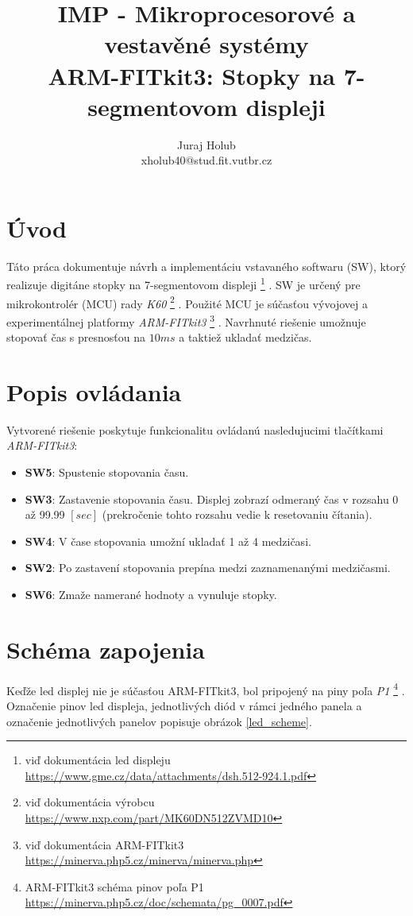 \documentclass[a4paper, 10pt]{article}
\title{IMP - Mikroprocesorové a vestavěné systémy \\ \medskip\medskip \large{ARM-FITkit3: Stopky na 7-segmentovom displeji}}
\author{Juraj Holub \\xholub40@stud.fit.vutbr.cz}
\begin{document}
	\maketitle
	\thispagestyle{empty}

\section{Úvod}
Táto práca dokumentuje návrh a implementáciu vstavaného softwaru (SW), ktorý realizuje digitáne stopky na 7-segmentovom displeji \footnote{viď dokumentácia led displeju  \href{https://www.gme.cz/data/attachments/dsh.512-924.1.pdf}{https://www.gme.cz/data/attachments/dsh.512-924.1.pdf}} . SW je určený pre mikrokontrolér (MCU) rady \textit{K60} \footnote{viď dokumentácia výrobcu  \href{https://www.nxp.com/part/MK60DN512ZVMD10}{https://www.nxp.com/part/MK60DN512ZVMD10}} . Použité MCU je súčasťou vývojovej a experimentálnej platformy \textit{ARM-FITkit3} \footnote{viď dokumentácia ARM-FITkit3  \href{https://minerva.php5.cz/minerva/minerva.php}{https://minerva.php5.cz/minerva/minerva.php}} . Navrhnuté riešenie umožnuje stopovať čas s presnosťou na $10ms$ a taktiež ukladať medzičas.

\section{Popis ovládania}
Vytvorené riešenie poskytuje funkcionalitu ovládanú nasledujucimi tlačítkami \textit{ARM-FITkit3}:
\begin{itemize}
	\item \textbf{SW5}: Spustenie stopovania času.
	\item \textbf{SW3}: Zastavenie stopovania času. Displej zobrazí odmeraný čas v rozsahu 0 až 99.99 $[sec]$ (prekročenie tohto rozsahu vedie k resetovaniu čítania).
	\item \textbf{SW4}: V čase stopovania umožní ukladať 1 až 4 medzičasi. 
	\item \textbf{SW2}: Po zastavení stopovania prepína medzi zaznamenanými medzičasmi.
	\item \textbf{SW6}: Zmaže namerané hodnoty a vynuluje stopky.
\end{itemize}

\section{Schéma zapojenia}
Keďže led displej nie je súčasťou ARM-FITkit3, bol pripojený na piny poľa \textit{P1} \footnote{ARM-FITkit3 schéma pinov poľa P1 \href{https://minerva.php5.cz/doc/schemata/pg_0007.pdf}{https://minerva.php5.cz/doc/schemata/pg\_0007.pdf}} . Označenie pinov led displeja, jednotlivých diód v rámci jedného panela a označenie jednotlivých panelov popisuje obrázok \ref{led_scheme}. 
\end{document}

